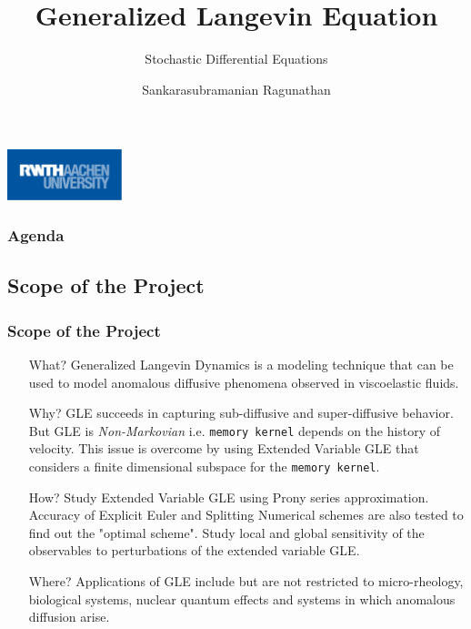 \documentclass[a4paper,10pt]{beamer}
\title{Generalized Langevin Equation}
\subtitle{Stochastic Differential Equations}
\author{Sankarasubramanian Ragunathan \newline \newline 389851}
\institute{\textbf{RWTH Aachen University}}
\date{}
\begin{document}
	\begin{frame}
		\titlepage
		\centering
		\includegraphics[width=0.25\textwidth]{RWTH_Aachen_University_Logo.eps}
	\end{frame}

	\begin{frame}
	\frametitle{Agenda}
		\footnotesize
		\tableofcontents
	\end{frame}

	\begin{frame}
		\normalsize
		\section{Scope of the Project}
		\frametitle{Scope of the Project}
		
		\begin{itemize}
			\item[What?]{Generalized Langevin Dynamics is a modeling technique that can be used to model anomalous diffusive phenomena observed in viscoelastic fluids.}
			
			\item[Why?]{GLE succeeds in capturing sub-diffusive and super-diffusive behavior. But GLE is \textit{Non-Markovian} i.e. \texttt{memory kernel} depends on the history of velocity. This issue is overcome by using Extended Variable GLE that considers a finite dimensional subspace for the \texttt{memory kernel}.}
			
			\item[How?]{Study Extended Variable GLE using Prony series approximation. Accuracy of Explicit Euler and Splitting Numerical schemes are also tested to find out the "optimal scheme". Study local and global sensitivity of the observables to perturbations of the extended variable GLE.}
			
			\item[Where?]{Applications of GLE include but are not restricted to micro-rheology, biological systems, nuclear quantum effects and systems in which anomalous diffusion arise.}
			
		\end{itemize}
	\end{frame}
\end{document}
